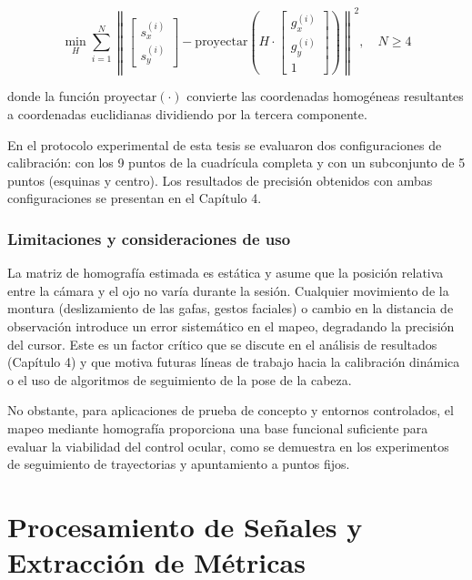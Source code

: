 \begin{equation}
	\min_{H} \sum_{i=1}^{N} \left\| 
	\begin{bmatrix} s_x^{(i)} \\ s_y^{(i)} \end{bmatrix} - 
	\text{proyectar}\!\left(H \cdot 
	\begin{bmatrix} g_x^{(i)} \\ g_y^{(i)} \\ 1 \end{bmatrix}\right)
	\right\|^2,
	\quad N \ge 4
	\label{eq:calibracion_homografia}
\end{equation}

donde la función $\text{proyectar}(\cdot)$ convierte las coordenadas homogéneas resultantes a coordenadas euclidianas dividiendo por la tercera componente.

En el protocolo experimental de esta tesis se evaluaron dos configuraciones de calibración: con los 9 puntos de la cuadrícula completa y con un subconjunto de 5 puntos (esquinas y centro). Los resultados de precisión obtenidos con ambas configuraciones se presentan en el Capítulo 4.

\subsubsection{Limitaciones y consideraciones de uso}

La matriz de homografía estimada es estática y asume que la posición relativa entre la cámara y el ojo no varía durante la sesión. Cualquier movimiento de la montura (deslizamiento de las gafas, gestos faciales) o cambio en la distancia de observación introduce un error sistemático en el mapeo, degradando la precisión del cursor. Este es un factor crítico que se discute en el análisis de resultados (Capítulo 4) y que motiva futuras líneas de trabajo hacia la calibración dinámica o el uso de algoritmos de seguimiento de la pose de la cabeza.

No obstante, para aplicaciones de prueba de concepto y entornos controlados, el mapeo mediante homografía proporciona una base funcional suficiente para evaluar la viabilidad del control ocular, como se demuestra en los experimentos de seguimiento de trayectorias y apuntamiento a puntos fijos.

\section{Procesamiento de Señales y Extracción de Métricas}

